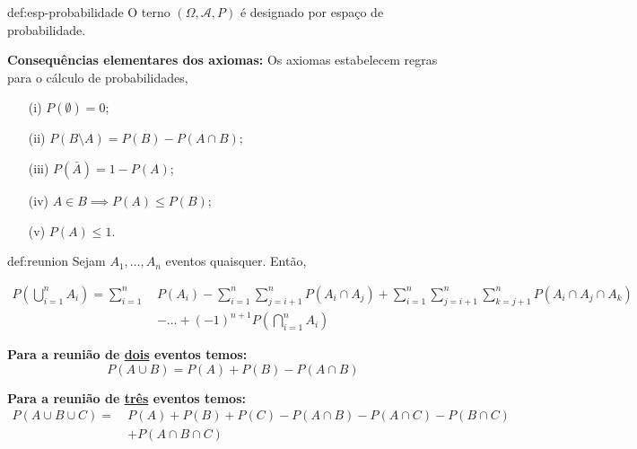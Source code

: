 \begin{theo}{def:esp-probabilidade}\label{def:esp-probabilidade}
    O terno $(\Omega, \mathcal{A}, P)$ é designado por espaço de probabilidade.
\end{theo}

\noindent \textbf{Consequências elementares dos axiomas:} Os axiomas estabelecem regras para o cálculo de probabilidades,

\vspace{-0.75 em}
\begin{enumerate}
    \item[(i)] $P(\emptyset) = 0$;
    \item[(ii)] $P(B \setminus A) = P(B) - P(A \cap B)$;
    \item[(iii)] $P(\bar{A}) = 1 - P(A)$;
    \item[(iv)] $A \in B \implies P(A) \leq P(B)$;
    \item[(v)] $P(A) \leq 1$.
\end{enumerate}

\begin{theo}{def:reunion}\label{def:reunion}
    Sejam $A_1, \dots, A_n$ eventos quaisquer. Então,

    \vspace{-1.5em}
    \begin{align*}
        P\left( \bigcup_{i=1}^{n} A_i \right) = \sum_{i=1}^{n}\: &P(A_i) - \sum_{i=1}^{n}\sum_{j=i+1}^{n} P(A_i \cap A_j) + \sum_{i=1}^{n}\sum_{j=i+1}^{n}\sum_{k=j+1}^{n} P(A_i \cap A_j \cap A_k) \\
        &- \dots + (-1)^{n+1} P\left( \bigcap_{i=1}^{n} A_i \right)
    \end{align*}

    \noindent \textbf{Para a reunião de \underline{dois} eventos temos:}
    \vspace{-0.75em}
    $$
        P(A \cup B) = P(A) + P(B) - P(A \cap B)
    $$
    
    \vspace{-0.75em}
    \noindent \textbf{Para a reunião de \underline{três} eventos temos:}
    \vspace{-0.75em}
    \begin{align*}
        P(A \cup B \cup C) =\: &P(A) + P(B) + P(C) - P(A \cap B) - P(A \cap C) - P(B \cap C)\\ &+ P(A \cap B \cap C)
    \end{align*}
\end{theo}

